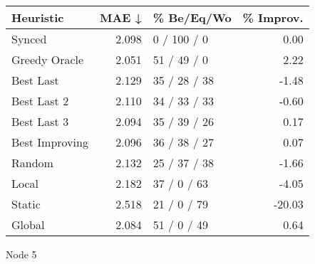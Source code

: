 \begin{tabular}{lrlr}
\toprule
\textbf{Heuristic} & \textbf{MAE ↓} & \textbf{\% Be/Eq/Wo} & \textbf{\% Improv.} \\
\midrule
            Synced &          2.098 &          0 / 100 / 0 &                0.00 \\
     Greedy Oracle &          2.051 &          51 / 49 / 0 &                2.22 \\
         Best Last &          2.129 &         35 / 28 / 38 &               -1.48 \\
       Best Last 2 &          2.110 &         34 / 33 / 33 &               -0.60 \\
       Best Last 3 &          2.094 &         35 / 39 / 26 &                0.17 \\
    Best Improving &          2.096 &         36 / 38 / 27 &                0.07 \\
            Random &          2.132 &         25 / 37 / 38 &               -1.66 \\
             Local &          2.182 &          37 / 0 / 63 &               -4.05 \\
            Static &          2.518 &          21 / 0 / 79 &              -20.03 \\
            Global &          2.084 &          51 / 0 / 49 &                0.64 \\
\bottomrule
\end{tabular}
\caption{Node 5}
\label{tab:hr_non_lr05_le2_bs4_5}

